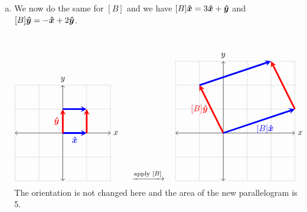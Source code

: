\documentclass[12pt]{article} %
\begin{document}
\begin{solution}
\begin{enumerate}[(a)]
        \item We now do the same for $[B]$ and we have $[B]\boldsymbol{\hat{x}} = 3\boldsymbol{\hat{x}} + \boldsymbol{\hat{y}}$ and $[B]\boldsymbol{\hat{y}} = -\boldsymbol{\hat{x}} + 2\boldsymbol{\hat{y}}$.
        \[
        \begin{tikzpicture}
        \draw[thin,gray!40] (-2,-2) grid (2,2);
        \draw[<->] (-2,0)--(2,0) node[right]{$x$};
        \draw[<->] (0,-2)--(0,2) node[above]{$y$};
        \draw[line width=2pt,blue,-stealth](0,0)--(1,0) node[anchor=north] at (.5,0){$\xhat$};
        \draw[line width=2pt, red, -stealth](0,0)--(0,1) node[anchor=east] at (0,.5){$\yhat$};
        \draw[line width=2pt, blue, -stealth](0,1)--(1,1) node[anchor=north] at (1,4){};
        \draw[line width=2pt, red, -stealth](1,0)--(1,1) node[anchor=south] at (1,4){};
        \end{tikzpicture}
        \quad \xrightarrow{\textrm{apply }[B]} \quad
        \begin{tikzpicture}
        \draw[thin,gray!40] (-2,-2) grid (3,3);
        \draw[<->] (-2,0)--(3,0) node[right]{$x$};
        \draw[<->] (0,-2)--(0,3) node[above]{$y$};
        \draw[line width=2pt,red,-stealth](0,0)--(-1,2) node[anchor=east] at (-.5,1){$[B]\yhat$};
        \draw[line width=2pt, blue, -stealth](0,0)--(3,1) node[anchor=north] at (1.75,.5){$[B]\xhat$};
        \draw[line width=2pt, red, -stealth](3,1)--(2,3) node[anchor=north] at (1,4){};
        \draw[line width=2pt, blue, -stealth](-1,2)--(2,3) node[anchor=south] at (1,4){};
        \end{tikzpicture}
        \]
        The orientation is not changed here and the area of the new parallelogram is 5.


\end{enumerate}
\end{solution}
\end{document}

